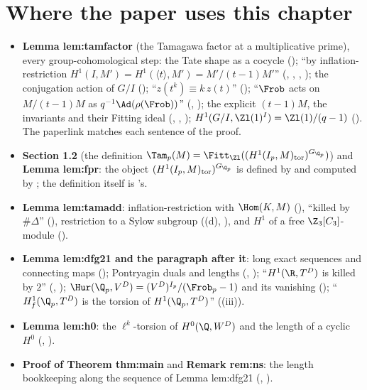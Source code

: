 \section*{Where the paper uses this chapter}

\begin{itemize}
\item \textbf{Lemma lem:tamfactor} (the Tamagawa factor at a multiplicative prime), every group-cohomological step: the Tate shape as a cocycle
(); ``by inflation-restriction $H^1(I,M')=H^1(\langle t\rangle,M')=M'/(t-1)M'$'' (, ,
, ); the conjugation action of $G/I$ (); ``$z(t^k)\equiv k\,z(t)$''
(); ``$\Frob$ acts on $M/(t-1)M$ as $q^{-1}\Ad(\rho(\Frob))$'' (, ); the explicit $(t-1)M$, the invariants and their
Fitting ideal (, , ); $H^1(G/I,\Zl(1)^I)=\Zl(1)/(q-1)$
(). The paperlink  matches each sentence of the proof.
\item \textbf{Section 1.2} (the definition $\Tam_p(M)=\Fitt_{\Zl}((H^1(I_p,M)_{\mathrm{tor}})^{G_{\Q_p}})$) and \textbf{Lemma lem:fpr}: the object $(H^1(I_p,M)_{\mathrm{tor}})^{G_{\Q_p}}$ is
defined by  and computed by ; the definition itself is 's.
\item \textbf{Lemma lem:tamadd}: inflation-restriction with $\Hom(K,M)$ (), ``killed by $\#\Delta$'' (), restriction to a
Sylow subgroup ((d), ), and $H^1$ of a free $\Z_3[C_3]$-module ().
\item \textbf{Lemma lem:dfg21 and the paragraph after it}: long exact sequences and connecting maps (); Pontryagin
duals and lengths (, ); ``$H^1(\R,T^D)$ is killed by $2$'' (, );
$\Hur(\Q_p,V^D)=(V^D)^{I_p}/(\Frob_p-1)$ and its vanishing (); ``$H^1_f(\Q_p,T^D)$ is the torsion of $H^1(\Q_p,T^D)$''
((iii)).
\item \textbf{Lemma lem:h0}: the $\ell^k$-torsion of $H^0(\Q,W^D)$ and the length of a cyclic $H^0$ (, ).
\item \textbf{Proof of Theorem thm:main} and \textbf{Remark rem:ns}: the length bookkeeping along the sequence of Lemma lem:dfg21 (,
).
\end{itemize}

